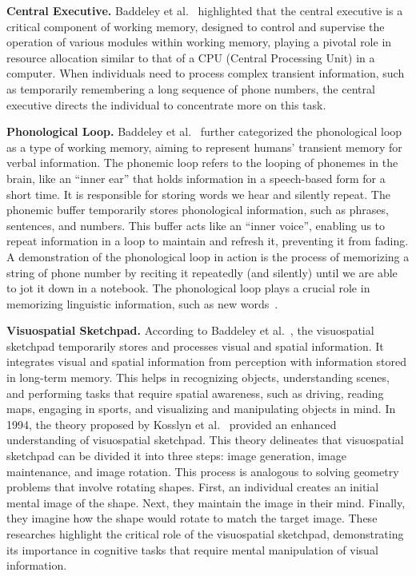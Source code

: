 \documentclass[journal,hideappendix]{vgtc}
\newenvironment{j_itemize}{
\begin{itemize}[]
  \setlength{\itemsep}{3pt}
  \setlength{\parskip}{0pt}
  \setlength{\parsep}{0pt}
}{\end{itemize}}
\begin{document}
\begin{j_itemize}

    \item[$\bullet$] \textbf{Central Executive.} Baddeley et al.~\cite{baddeley1974working,baddeley1986working} highlighted that the central executive is a critical component of working memory, designed to control and supervise the operation of various modules within working memory, playing a pivotal role in resource allocation similar to that of a CPU (Central Processing Unit) in a computer. When individuals need to process complex transient information, such as temporarily remembering a long sequence of phone numbers, the central executive directs the individual to concentrate more on this task.

    \item[$\bullet$] \textbf{Phonological Loop.} Baddeley et al.~\cite{baddeley1986working} further categorized the phonological loop as a type of working memory, aiming to represent humans' transient memory for verbal information. The phonemic loop refers to the looping of phonemes in the brain, like an ``inner ear'' that holds information in a speech-based form for a short time. It is responsible for storing words we hear and silently repeat.
    The phonemic buffer temporarily stores phonological information, such as phrases, sentences, and numbers. This buffer acts like an ``inner voice'', enabling us to repeat information in a loop to maintain and refresh it, preventing it from fading. A demonstration of the phonological loop in action is the process of memorizing a string of phone number by reciting it repeatedly (and silently)  until we are able to jot it down in a notebook.
    The phonological loop plays a crucial role in memorizing linguistic information, such as new words~\cite{baddeley1998phonological}.

    \item[$\bullet$] \textbf{Visuospatial Sketchpad.} According to Baddeley et al.~\cite{baddeley1986working}, the visuospatial sketchpad temporarily stores and processes visual and spatial information. It integrates visual and spatial information from perception with information stored in long-term memory. This helps in recognizing objects, understanding scenes, and performing tasks that require spatial awareness, such as driving, reading maps, engaging in sports, and visualizing and manipulating objects in mind. In 1994, the theory proposed by Kosslyn et al.~\cite{kosslyn1994image} provided an enhanced understanding of visuospatial sketchpad. This theory delineates that visuospatial sketchpad can be divided it into three steps: image generation, image maintenance, and image rotation. This process is analogous to solving geometry problems that involve rotating shapes. First, an individual creates an initial mental image of the shape. Next, they maintain the image in their mind. Finally, they imagine how the shape would rotate to match the target image. These researches highlight the critical role of the visuospatial sketchpad, demonstrating its importance in cognitive tasks that require mental manipulation of visual information.


\end{j_itemize}
\end{document}
